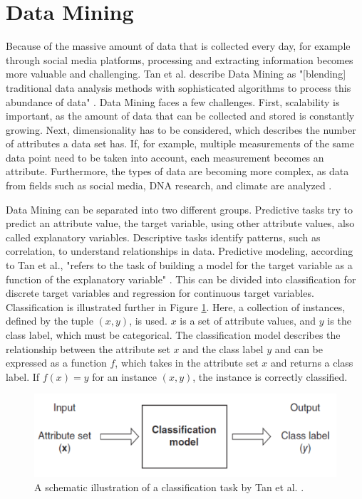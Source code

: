 \section{Data Mining}
Because of the massive amount of data that is collected every day, for example through social media platforms, processing and extracting information becomes more valuable and challenging. Tan et al. describe Data Mining as "[blending] traditional data analysis methods with sophisticated algorithms to process this abundance of data" \cite[p.~21]{DBLP:books/aw/TanSKK2019}. Data Mining faces a few challenges. First, scalability is important, as the amount of data that can be collected and stored is constantly growing. Next, dimensionality has to be considered, which describes the number of attributes a data set has. If, for example, multiple measurements of the same data point need to be taken into account, each measurement becomes an attribute. Furthermore, the types of data are becoming more complex, as data from fields such as social media, DNA research, and climate are analyzed \cite{DBLP:books/aw/TanSKK2019}.

Data Mining can be separated into two different groups. Predictive tasks try to predict an attribute value, the target variable, using other attribute values, also called explanatory variables. Descriptive tasks identify patterns, such as correlation, to understand relationships in data. Predictive modeling, according to Tan et al., "refers to the task of building a model for the target variable as a function of the explanatory variable" \cite[p.~29]{DBLP:books/aw/TanSKK2019}. This can be divided into classification for discrete target variables and regression for continuous target variables. Classification is illustrated further in Figure \ref{fig:classifiation}. Here, a collection of instances, defined by the tuple $(x,y)$, is used. $x$ is a set of attribute values, and $y$ is the class label, which must be categorical. The classification model describes the relationship between the attribute set $x$ and the class label $y$ and can be expressed as a function $f$, which takes in the attribute set $x$ and returns a class label. If $f(x) = y$ for an instance $(x,y)$, the instance is correctly classified.
\begin{figure}
    \centering
    \includegraphics[scale = 0.6]{Images/classification.png}
    \caption{A schematic illustration of a classification task by Tan et al. \cite[p.~134]{DBLP:books/aw/TanSKK2019}.}
    \label{fig:classifiation}
\end{figure}


